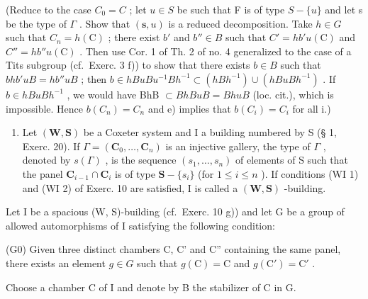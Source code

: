 (Reduce to the case \(C_{0} = C\) ; let \(u \in S\) be such that F is of type \(S - \{u\}\) and let s be the type of \(\Gamma\) . Show that \((\mathbf{s}, u)\) is a reduced decomposition. Take \(h \in G\) such that \(C_{n} = h(\mathrm{C})\) ; there exist \(b'\) and \(b'' \in B\) such that \(C' = hb'u(\mathrm{C})\) and \(C'' = hb''u(\mathrm{C})\) . Then use Cor. 1 of Th. 2 of no. 4 generalized to the case of a Tits subgroup (cf.~Exerc. 3 f)) to show that there exists \(b \in B\) such that \(bhb'uB = hb''uB\) ; then \(b \in hBuBu^{-1}Bh^{-1} \subset (hBh^{-1}) \cup (hBuBh^{-1})\) . If \(b \in hBuBh^{-1}\) , we would have BhB \(\subset BhBuB = BhuB\) (loc. cit.), which is impossible. Hence \(b(C_{n}) = C_{n}\) and e) implies that \(b(C_{i}) = C_{i}\) for all i.)

\begin{enumerate}
\def\labelenumi{\arabic{enumi})}
\setcounter{enumi}{10}
\tightlist
\item
  Let \((\mathbf{W},\mathbf{S})\) be a Coxeter system and I a building numbered by S (§ 1, Exerc. 20). If \(\Gamma = (\mathbf{C}_0,\dots ,\mathbf{C}_n)\) is an injective gallery, the type of \(\Gamma\) , denoted by \(s(\Gamma)\) , is the sequence \((s_1,\ldots ,s_n)\) of elements of S such that the panel \(\mathbf{C}_{i - 1}\cap \mathbf{C}_i\) is of type \(\mathbf{S} - \{s_i\}\) (for \(1\leqslant i\leqslant n\) ). If conditions (WI 1) and (WI 2) of Exerc. 10 are satisfied, I is called a \((\mathbf{W},\mathbf{S})\) -building.
\end{enumerate}

Let I be a spacious (W, S)-building (cf.~Exerc. 10 g)) and let G be a group of allowed automorphisms of I satisfying the following condition:

(G0) Given three distinct chambers C, C' and C'' containing the same panel, there exists an element \(g \in G\) such that \(g(\mathrm{C}) = \mathrm{C}\) and \(g(\mathrm{C}') = \mathrm{C}'\) .

Choose a chamber C of I and denote by B the stabilizer of C in G.

